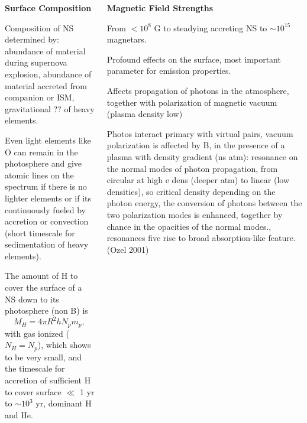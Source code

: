 \begin{frame}

\begin{columns}[c]
\begin{column}{0.5\textwidth} 
	{\bf \center Surface Composition}

\begin{itemize}\scriptsize{ 
 \item Composition of NS determined by: abundance of material during supernova explosion, abundance of material accreted from companion or ISM, gravitational ?? of heavy elements.
 \item Even  light elements like O can remain in the photosphere and give atomic lines on the spectrum  if there is no lighter elements or if its continuously fueled by accretion or convection (short timescale for sedimentation of heavy elements).
 \item The amount of H to cover the surface of a NS down to its photosphere (non B) is
 $$ M_H = 4 \pi R^2 h N_p m_p,$$
 with gas ionized ($N_H=N_p$), which shows to be very small, and the timescale for accretion of sufficient H to cover surface $\ll$ 1 yr to $\sim 10^3$ yr, dominant H and He.}
 \end{itemize}

\end{column}
\begin{column}{0.5\textwidth} 
 
 	{\bf \center  Magnetic Field Strengths}
 \begin{itemize}\scriptsize{ 
  \item From $<10^8$ G to steadying accreting NS to $\sim 10^{15}$ magnetars.
  \item Profound effects on the surface, most important parameter for emission properties.
  \item Affects propagation of photons in the atmosphere, together with polarization of magnetic vacuum (plasma density low)
  \item Photos interact primary  with virtual pairs, vacuum polarization is affected by B, in the presence of a plasma with density gradient (ns atm): resonance on the normal modes of photon propagation, from circular at high e dens (deeper atm) to linear (low densities), so critical density depending on the photon energy, the conversion of photons between the two polarization modes is enhanced, together by chance in the opacities of the normal modes., resonances five rise to broad absorption-like feature. {\tiny (Ozel 2001)}}
 \end{itemize}
 \end{column}
 \end{columns}
\end{frame}




